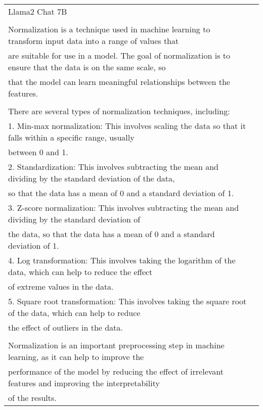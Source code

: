 \begin{center}
\begin{threeparttable}[t]
{\begin{tabular}{l|l}
                                                                                                                                                                                                                                                                                                                                                                                                                                                                                                                                                                                                                                                                                                                                                                                                                                            \\ \hline
Llama2 Chat 7B & \begin{tabular}[c]{@{}l@{}}Can you explain the concept of normalization in machine learning? \\ \\ Normalization is a technique used in machine learning to transform input data into a range of values that \\ are suitable for use in a model. The goal of normalization is to ensure that the data is on the same scale, so \\ that the model can learn meaningful relationships between the features. \\ \\ There are several types of normalization techniques, including: \\ 1. Min-max normalization: This involves scaling the data so that it falls within a specific range, usually \\ between 0 and 1. \\ 2. Standardization: This involves subtracting the mean and dividing by the standard deviation of the data, \\ so that the data has a mean of 0 and a standard deviation of 1. \\ 3. Z-score normalization: This involves subtracting the mean and dividing by the standard deviation of \\ the data, so that the data has a mean of 0 and a standard deviation of 1. \\ 4. Log transformation: This involves taking the logarithm of the data, which can help to reduce the effect \\ of extreme values in the data. \\ 5. Square root transformation: This involves taking the square root of the data, which can help to reduce \\ the effect of outliers in the data. \\ \\ Normalization is an important preprocessing step in machine learning, as it can help to improve the \\ performance of the model by reducing the effect of irrelevant features and improving the interpretability \\ of the results. 
\end{tabular}}
\end{threeparttable}
\end{center}

